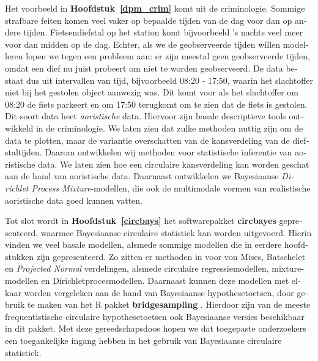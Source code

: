 \documentclass[12pt, a4paper]{book}\usepackage[]{graphicx}\usepackage{xcolor}
\let\proglang=\textsf
\newcommand{\pkg}[1]{\textbf{#1}}
\begin{document}
\begin{otherlanguage}{dutch}
Het voorbeeld in \textbf{Hoofdstuk~\ref{dpm_crim}} komt uit de criminologie. Sommige strafbare feiten komen veel vaker op bepaalde tijden van de dag voor dan op andere tijden. Fietsendiefstal op het station komt bijvoorbeeld 's nachts veel meer voor dan midden op de dag. Echter, als we de geobserveerde tijden willen modelleren lopen we tegen een probleem aan: er zijn meestal geen geobserveerde tijden, omdat een dief nu juist probeert om niet te worden geobserveerd. De data bestaat dus uit intervallen van tijd, bijvoorbeeld 08:20 - 17:50, waarin het slachtoffer niet bij het gestolen object aanwezig was. Dit komt voor als het slachtoffer om 08:20 de fiets parkeert en om 17:50 terugkomt om te zien dat de fiets is gestolen. Dit soort data heet \textit{aoristische} data. Hiervoor zijn basale descriptieve tools ontwikkeld \citep{ashby2013comparison} in de criminologie. We laten zien dat zulke methoden nuttig zijn om de data te plotten, maar de variantie overschatten van de kansverdeling van de diefstaltijden. Daarom ontwikkelen wij methoden voor statistische inferentie van aoristische data. We laten zien hoe een circulaire kansverdeling kan worden geschat aan de hand van aoristische data. Daarnaast ontwikkelen we Bayesiaanse \textit{Dirichlet Process Mixture}-modellen, die ook de multimodale vormen van realistische aoristische data goed kunnen vatten.

Tot slot wordt in \textbf{Hoofdstuk~\ref{circbays}} het softwarepakket \pkg{circbayes} gepresenteerd, waarmee Bayesiaanse circulaire statistiek kan worden uitgevoerd. Hierin vinden we veel basale modellen, alsmede sommige modellen die in eerdere hoofdstukken zijn gepresenteerd. Zo zitten er methoden in voor von Mises, Batschelet en \textit{Projected Normal} verdelingen, alsmede circulaire regressiemodellen, mixture-modellen en Dirichletprocesmodellen. Daarnaast kunnen deze modellen met elkaar worden vergeleken aan de hand van Bayesiaanse hypothesetoetsen, door gebruik te maken van het \proglang{R} pakket \pkg{bridgesampling} \citep{gronau2017bridgesampling}. Hierdoor zijn van de meeste frequentistische circulaire hypothesetoetsen ook Bayesiaanse versies beschikbaar in dit pakket. Met deze gereedschapsdoos hopen we dat toegepaste onderzoekers een toegankelijke ingang hebben in het gebruik van Bayesiaanse circulaire statistiek.

\end{otherlanguage}



\end{document}

